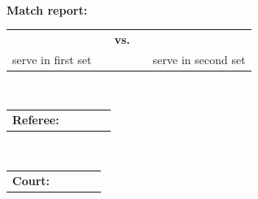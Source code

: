 \documentclass[
	a4paper,
	headinclude=false,
	footinclude=false,
	]{scrartcl}
\begin{document}
	\begin{center}
	   \huge{\textbf{\tournamentname}}\\
	   \vspace{1.25em}
	   \setlength{\ULdepth}{3pt}
	   \LARGE{\textbf{Match report: \uline{$\text{~~~~}$}}}\\
	   \vspace{1.5em}
	   \Large{
	       \renewcommand{\arraystretch}{0.8}
	       \begin{tabular}{@{}R{0.394\textwidth}@{}C{.25em}@{}C{.075\textwidth}@{}C{.25em}@{}L{.394\textwidth}@{}}
	             && \textbf{vs.} &&  \\[-.1em]
	            \small{serve in first set} & & &  & \small{serve in second set}
	       \end{tabular}
	   }\\[1.5em]
	   \large{
	       \renewcommand{\arraystretch}{0.7}
	       \begin{tabular}{@{}L{.128\textwidth}@{}C{.25em}@{}L{.394\textwidth}@{}C{.25em}@{}L{.347\textwidth}@{}}%
	            \textbf{Referee:} &&  && \\
	       \end{tabular}\\[1.25em]
	       \begin{tabular}{@{}L{.128\textwidth}@{}C{.25em}@{}C{.044\textwidth}@{}C{.25em}@{}L{.697\textwidth}@{}}%
	        \textbf{Court:} &&  && \\
	       \end{tabular}
	   }
	\end{center}
	\vspace{-.5em}
\end{document}

